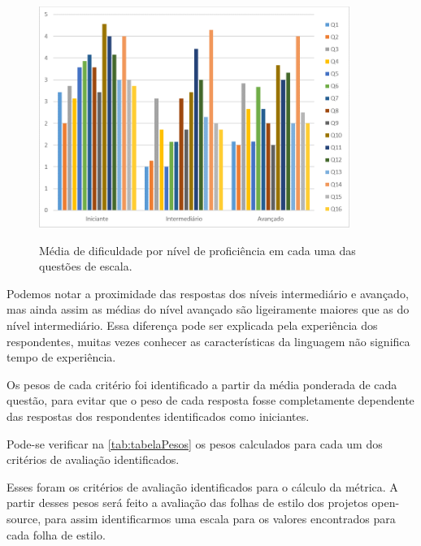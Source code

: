 \begin{figure}[!htb]
	\centering
	\caption{Média de dificuldade por nível de proficiência em cada uma das questões de escala.}
	\includegraphics[width=0.9\textwidth]{./04-figuras/graph_scaleMean}
	\label{fig:graph_scaleMean}
\end{figure}

Podemos notar a proximidade das respostas dos níveis intermediário e avançado, mas ainda assim as médias do nível avançado são ligeiramente maiores que as do nível intermediário. Essa diferença pode ser explicada pela experiência dos respondentes, muitas vezes conhecer as características da linguagem não significa tempo de experiência.

Os pesos de cada critério foi identificado a partir da média ponderada de cada questão, para evitar que o peso de cada resposta fosse completamente dependente das respostas dos respondentes identificados como iniciantes.

Pode-se verificar na \autoref{tab:tabelaPesos} os pesos calculados para cada um dos critérios de avaliação identificados.



Esses foram os critérios de avaliação identificados para o cálculo da métrica. A partir desses pesos será feito a avaliação das folhas de estilo dos projetos open-source, para assim identificarmos uma escala para os valores encontrados para cada folha de estilo.